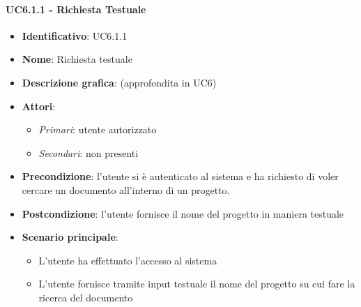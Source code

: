 \paragraph{UC6.1.1 - Richiesta Testuale}
\begin{itemize}
   \item \textbf{Identificativo}: UC6.1.1
   \item \textbf{Nome}: Richiesta testuale
   \item \textbf{Descrizione grafica}: (approfondita in UC6)
   \item \textbf{Attori}:
   \begin{itemize} 
       \item \textit{Primari}: utente autorizzato
       \item \textit{Secondari}: non presenti
   \end{itemize}
       \item \textbf{Precondizione}: l'utente si è autenticato al sistema e ha richiesto di voler cercare un documento all'interno di un progetto.
       \item \textbf{Postcondizione}: l'utente fornisce il nome del progetto in maniera testuale
    \item \textbf{Scenario principale}: 
       \begin{itemize}
           \item L'utente ha effettuato l'accesso al sistema 
           \item L'utente fornisce tramite input testuale il nome del progetto su cui fare la ricerca del documento
       \end{itemize}
\end{itemize}

